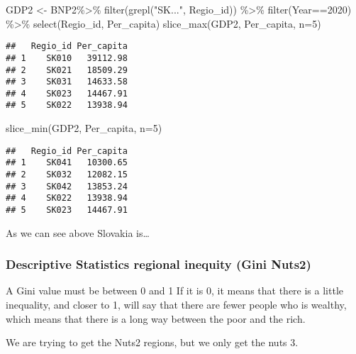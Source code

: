 \documentclass[
]{article}
\newenvironment{Shaded}{\begin{snugshade}}{\end{snugshade}}
\newcommand{\AttributeTok}[1]{\textcolor[rgb]{0.77,0.63,0.00}{#1}}
\newcommand{\DecValTok}[1]{\textcolor[rgb]{0.00,0.00,0.81}{#1}}
\newcommand{\FunctionTok}[1]{\textcolor[rgb]{0.00,0.00,0.00}{#1}}
\newcommand{\NormalTok}[1]{#1}
\newcommand{\OtherTok}[1]{\textcolor[rgb]{0.56,0.35,0.01}{#1}}
\newcommand{\SpecialCharTok}[1]{\textcolor[rgb]{0.00,0.00,0.00}{#1}}
\newcommand{\StringTok}[1]{\textcolor[rgb]{0.31,0.60,0.02}{#1}}
\begin{document}
\begin{Shaded}
\begin{Highlighting}[]
\NormalTok{GDP2 }\OtherTok{\textless{}{-}}\NormalTok{ BNP2}\SpecialCharTok{\%\textgreater{}\%}
  \FunctionTok{filter}\NormalTok{(}\FunctionTok{grepl}\NormalTok{(}\StringTok{"SK..."}\NormalTok{, Regio\_id)) }\SpecialCharTok{\%\textgreater{}\%}
  \FunctionTok{filter}\NormalTok{(Year}\SpecialCharTok{==}\DecValTok{2020}\NormalTok{) }\SpecialCharTok{\%\textgreater{}\%}
  \FunctionTok{select}\NormalTok{(Regio\_id, Per\_capita)}
\FunctionTok{slice\_max}\NormalTok{(GDP2, Per\_capita, }\AttributeTok{n=}\DecValTok{5}\NormalTok{)}
\end{Highlighting}
\end{Shaded}

\begin{verbatim}
##   Regio_id Per_capita
## 1    SK010   39112.98
## 2    SK021   18509.29
## 3    SK031   14633.58
## 4    SK023   14467.91
## 5    SK022   13938.94
\end{verbatim}

\begin{Shaded}
\begin{Highlighting}[]
\FunctionTok{slice\_min}\NormalTok{(GDP2, Per\_capita, }\AttributeTok{n=}\DecValTok{5}\NormalTok{)}
\end{Highlighting}
\end{Shaded}

\begin{verbatim}
##   Regio_id Per_capita
## 1    SK041   10300.65
## 2    SK032   12082.15
## 3    SK042   13853.24
## 4    SK022   13938.94
## 5    SK023   14467.91
\end{verbatim}

As we can see above Slovakia is\ldots{}

\hypertarget{descriptive-statistics-regional-inequity-gini-nuts2}{%
\subsubsection{Descriptive Statistics regional inequity (Gini
Nuts2)}\label{descriptive-statistics-regional-inequity-gini-nuts2}}

A Gini value must be between 0 and 1 If it is 0, it means that there is
a little inequality, and closer to 1, will say that there are fewer
people who is wealthy, which means that there is a long way between the
poor and the rich.

We are trying to get the Nuts2 regions, but we only get the nuts 3.
\end{document}
